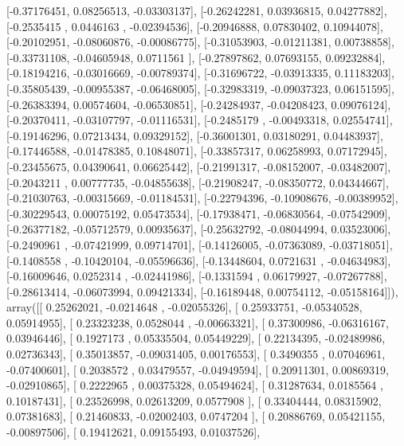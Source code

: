 \documentclass{article}
\begin{document}
       [-0.37176451,  0.08256513, -0.03303137],
       [-0.26242281,  0.03936815,  0.04277882],
       [-0.2535415 ,  0.0446163 , -0.02394536],
       [-0.20946888,  0.07830402,  0.10944078],
       [-0.20102951, -0.08060876, -0.00086775],
       [-0.31053903, -0.01211381,  0.00738858],
       [-0.33731108, -0.04605948,  0.0711561 ],
       [-0.27897862,  0.07693155,  0.09232884],
       [-0.18194216, -0.03016669, -0.00789374],
       [-0.31696722, -0.03913335,  0.11183203],
       [-0.35805439, -0.00955387, -0.06468005],
       [-0.32983319, -0.09037323,  0.06151595],
       [-0.26383394,  0.00574604, -0.06530851],
       [-0.24284937, -0.04208423,  0.09076124],
       [-0.20370411, -0.03107797, -0.01116531],
       [-0.2485179 , -0.00493318,  0.02554741],
       [-0.19146296,  0.07213434,  0.09329152],
       [-0.36001301,  0.03180291,  0.04483937],
       [-0.17446588, -0.01478385,  0.10848071],
       [-0.33857317,  0.06258993,  0.07172945],
       [-0.23455675,  0.04390641,  0.06625442],
       [-0.21991317, -0.08152007, -0.03482007],
       [-0.2043211 ,  0.00777735, -0.04855638],
       [-0.21908247, -0.08350772,  0.04344667],
       [-0.21030763, -0.00315669, -0.01184531],
       [-0.22794396, -0.10908676, -0.00389952],
       [-0.30229543,  0.00075192,  0.05473534],
       [-0.17938471, -0.06830564, -0.07542909],
       [-0.26377182, -0.05712579,  0.00935637],
       [-0.25632792, -0.08044994,  0.03523006],
       [-0.2490961 , -0.07421999,  0.09714701],
       [-0.14126005, -0.07363089, -0.03718051],
       [-0.1408558 , -0.10420104, -0.05596636],
       [-0.13448604,  0.0721631 , -0.04634983],
       [-0.16009646,  0.0252314 , -0.02441986],
       [-0.1331594 ,  0.06179927, -0.07267788],
       [-0.28613414, -0.06073994,  0.09421334],
       [-0.16189448,  0.00754112, -0.05158164]]), array([[ 0.25262021, -0.0214648 , -0.02055326],
       [ 0.25933751, -0.05340528,  0.05914955],
       [ 0.23323238,  0.0528044 , -0.00663321],
       [ 0.37300986, -0.06316167,  0.03946446],
       [ 0.1927173 ,  0.05335504,  0.05449229],
       [ 0.22134395, -0.02489986,  0.02736343],
       [ 0.35013857, -0.09031405,  0.00176553],
       [ 0.3490355 ,  0.07046961, -0.07400601],
       [ 0.2038572 ,  0.03479557, -0.04949594],
       [ 0.20911301,  0.00869319, -0.02910865],
       [ 0.2222965 ,  0.00375328,  0.05494624],
       [ 0.31287634,  0.0185564 ,  0.10187431],
       [ 0.23526998,  0.02613209,  0.0577908 ],
       [ 0.33404444,  0.08315902,  0.07381683],
       [ 0.21460833, -0.02002403,  0.0747204 ],
       [ 0.20886769,  0.05421155, -0.00897506],
       [ 0.19412621,  0.09155493,  0.01037526],
\end{document}
